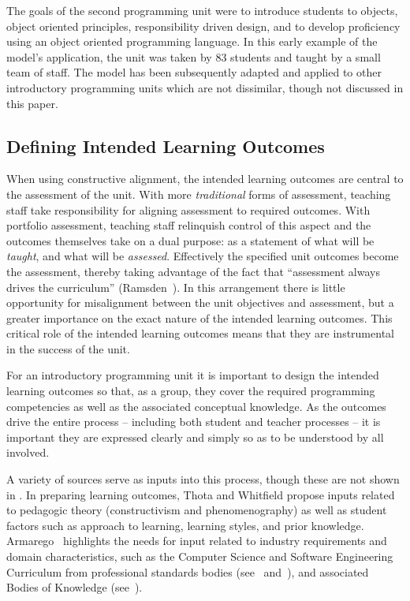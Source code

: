 The goals of the second programming unit were to introduce students to objects, object oriented principles, responsibility driven design, and to develop proficiency using an object oriented programming language. In this early example of the model's application, the unit was taken by 83 students and taught by a small team of staff. The model has been subsequently adapted and applied to other introductory programming units which are not dissimilar, though not discussed in this paper.

\subsection{Defining Intended Learning Outcomes} %
\label{sub:defining_intended_learning_outcomes}

When using constructive alignment, the intended learning outcomes are central to the assessment of the unit. With more \emph{traditional} forms of assessment, teaching staff take responsibility for aligning assessment to required outcomes. With portfolio assessment, teaching staff relinquish control of this aspect and the outcomes themselves take on a dual purpose: as a statement of what will be \emph{taught}, and what will be \emph{assessed}. Effectively the specified unit outcomes become the assessment, thereby taking advantage of the fact that ``assessment always drives the curriculum'' (Ramsden~\cite{Ramsden:1992}).  In this arrangement there is little opportunity for misalignment between the unit objectives and assessment, but a greater importance on the exact nature of the intended learning outcomes. This critical role of the intended learning outcomes means that they are instrumental in the success of the unit. 

For an introductory programming unit it is important to design the intended learning outcomes so that, as a group, they cover the required programming competencies as well as the associated conceptual knowledge. As the outcomes drive the entire process -- including both student and teacher processes -- it is important they are expressed clearly and simply so as to be understood by all involved.

A variety of sources serve as inputs into this process, though these are not shown in . In preparing learning outcomes, Thota and Whitfield propose inputs related to pedagogic theory (constructivism and phenomenography) as well as student factors such as approach to learning, learning styles, and prior knowledge. Armarego~\cite{Armarego:2009} highlights the needs for input related to industry requirements and domain characteristics, such as the Computer Science and Software Engineering Curriculum from professional standards bodies (see~\cite{Lethbridge:2006} and~\cite{Cassel:2008}), and associated Bodies of Knowledge (see~\cite{Abran:2001}).

